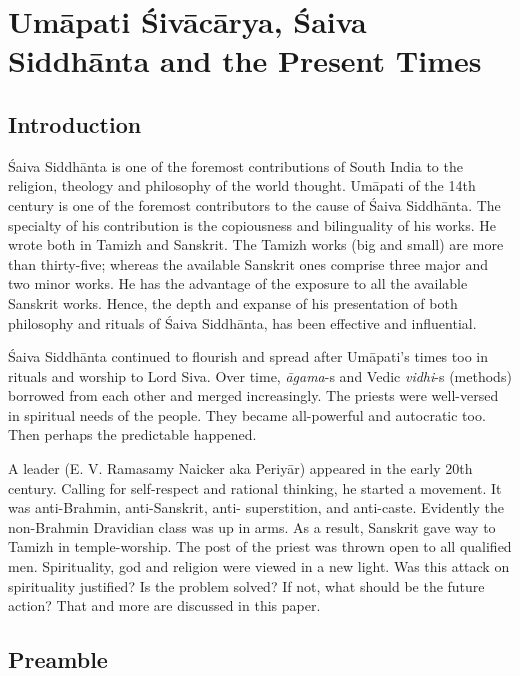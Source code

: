 
\chapter{Umāpati Śivācārya, Śaiva Siddhānta and the Present Times}\label{chapter9}



\section*{Introduction}

Śaiva Siddhānta is one of the foremost contributions of South India to the religion, theology and philosophy of the world thought. Umāpati of the 14th century is one of the foremost contributors to the cause of Śaiva Siddhānta. The specialty of his contribution is the copiousness and bilinguality of his works. He wrote both in Tamizh and Sanskrit. The Tamizh works (big and small) are more than thirty-five; whereas the available Sanskrit ones comprise three major and two minor works. He has the advantage of the exposure to all the available Sanskrit works. Hence, the depth and expanse of his presentation of both philosophy and rituals of Śaiva Siddhānta, has been effective and influential.

Śaiva Siddhānta continued to flourish and spread after Umāpati’s times too in rituals and worship to Lord Siva. Over time, \textit{āgama}-s and Vedic \textit{vidhi}-s (methods) borrowed from each other and merged increasingly. The priests were well-versed in spiritual needs of the people. They became all-powerful and autocratic too. Then perhaps the predictable happened.

A leader (E. V. Ramasamy Naicker aka Periyār) appeared in the early 20th century. Calling for self-respect and rational thinking, he started a movement. It was anti-Brahmin, anti-Sanskrit, anti- superstition, and anti-caste. Evidently the non-Brahmin Dravidian class was up in arms. As a result, Sanskrit gave way to Tamizh in temple-worship. The post of the priest was thrown open to all qualified men. Spirituality, god and religion were viewed in a new light. Was this attack on spirituality justified? Is the problem solved? If not, what should be the future action? That and more are discussed in this paper.


\section*{Preamble}

